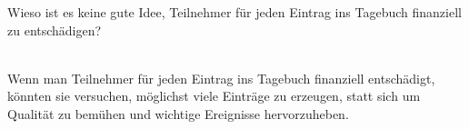\begin{exercise}
  Wieso ist es keine gute Idee, Teilnehmer für jeden Eintrag ins Tagebuch finanziell zu entschädigen?
  \\\\
\end{exercise}
Wenn man Teilnehmer für jeden Eintrag ins Tagebuch finanziell entschädigt,
könnten sie versuchen, möglichst viele Einträge zu erzeugen,
statt sich um Qualität zu bemühen und wichtige Ereignisse hervorzuheben.